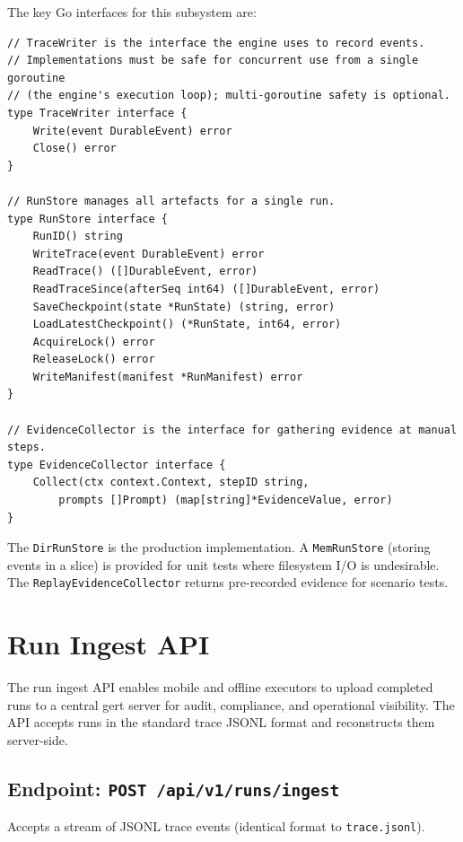 The key Go interfaces for this subsystem are:

\begin{verbatim}
// TraceWriter is the interface the engine uses to record events.
// Implementations must be safe for concurrent use from a single goroutine
// (the engine's execution loop); multi-goroutine safety is optional.
type TraceWriter interface {
    Write(event DurableEvent) error
    Close() error
}

// RunStore manages all artefacts for a single run.
type RunStore interface {
    RunID() string
    WriteTrace(event DurableEvent) error
    ReadTrace() ([]DurableEvent, error)
    ReadTraceSince(afterSeq int64) ([]DurableEvent, error)
    SaveCheckpoint(state *RunState) (string, error)
    LoadLatestCheckpoint() (*RunState, int64, error)
    AcquireLock() error
    ReleaseLock() error
    WriteManifest(manifest *RunManifest) error
}

// EvidenceCollector is the interface for gathering evidence at manual steps.
type EvidenceCollector interface {
    Collect(ctx context.Context, stepID string,
        prompts []Prompt) (map[string]*EvidenceValue, error)
}
\end{verbatim}

The \texttt{DirRunStore} is the production implementation. A \texttt{MemRunStore} (storing events in a slice) is provided for unit tests where filesystem I/O is undesirable. The \texttt{ReplayEvidenceCollector} returns pre-recorded evidence for scenario tests.

\section{Run Ingest API}

The run ingest API enables mobile and offline executors to upload completed runs to a central gert server for audit, compliance, and operational visibility. The API accepts runs in the standard trace JSONL format and reconstructs them server-side.

\subsection{Endpoint: \texttt{POST /api/v1/runs/ingest}}

Accepts a stream of JSONL trace events (identical format to \texttt{trace.jsonl}).

